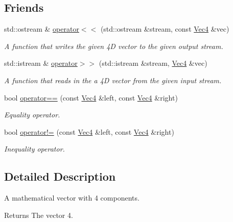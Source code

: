 \subsection*{Friends}
\begin{DoxyCompactItemize}
\item 
std\+::ostream \& \hyperlink{structgfxmath_1_1_vec4_a31c794bedecdf686aae40b9261ea38c5}{operator$<$$<$} (std\+::ostream \&stream, const \hyperlink{structgfxmath_1_1_vec4}{Vec4} \&vec)
\begin{DoxyCompactList}\small\item\em A function that writes the given 4\+D vector to the given output stream. \end{DoxyCompactList}\item 
std\+::istream \& \hyperlink{structgfxmath_1_1_vec4_ab5d34a5bf6bb543ab690436fc45c7319}{operator$>$$>$} (std\+::istream \&stream, \hyperlink{structgfxmath_1_1_vec4}{Vec4} \&vec)
\begin{DoxyCompactList}\small\item\em A function that reads in the a 4\+D vector from the given input stream. \end{DoxyCompactList}\item 
bool \hyperlink{structgfxmath_1_1_vec4_a75ec0a4eb1bdb2abb83280b62f2e94d3}{operator==} (const \hyperlink{structgfxmath_1_1_vec4}{Vec4} \&left, const \hyperlink{structgfxmath_1_1_vec4}{Vec4} \&right)
\begin{DoxyCompactList}\small\item\em Equality operator. \end{DoxyCompactList}\item 
bool \hyperlink{structgfxmath_1_1_vec4_a8ddc017b9087be64efa4fc76f1f63a12}{operator!=} (const \hyperlink{structgfxmath_1_1_vec4}{Vec4} \&left, const \hyperlink{structgfxmath_1_1_vec4}{Vec4} \&right)
\begin{DoxyCompactList}\small\item\em Inequality operator. \end{DoxyCompactList}\end{DoxyCompactItemize}


\subsection{Detailed Description}
A mathematical vector with 4 components. 

\begin{DoxyReturn}{Returns}
The vector 4. 
\end{DoxyReturn}


